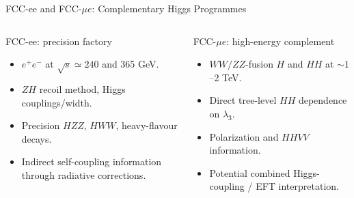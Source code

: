 \documentclass[aspectratio=1610,english]{beamer}
\newcommand{\src}[1]{\vfill{\par\color{black!65}\fontsize{6.4}{7.4}\selectfont\emph{Source:} #1\par}}
\newcommand{\key}[1]{\begin{alertblock}{Physics takeaway}\small  #1\end{alertblock}}
\begin{document}
\begin{frame}[t]{FCC-ee and FCC-$\mu e$: Complementary Higgs Programmes}
\small

\begin{columns}%
\begin{exampleblock}{FCC-ee: precision factory}
\begin{itemize}
\justifying
\item $e^+e^-$ at $\sqrt{s}\simeq240$ and 365 GeV.
\item $ZH$ recoil method, Higgs couplings/width.
\item Precision $HZZ$, $HWW$, heavy-flavour decays.
\item Indirect self-coupling information through radiative corrections.
\end{itemize}\end{exampleblock}
\begin{alertblock}{FCC-$\mu e$: high-energy complement}
\begin{itemize}
\justifying
\item $WW/ZZ$-fusion $H$ and $HH$ at $\sim1$--2 TeV.
\item Direct tree-level $HH$ dependence on $\lambda_3$.
\item Polarization and $HHVV$ information.
\item Potential combined Higgs-coupling / EFT interpretation.
\end{itemize}\end{alertblock}
\end{columns}


\end{frame}
\end{document}
